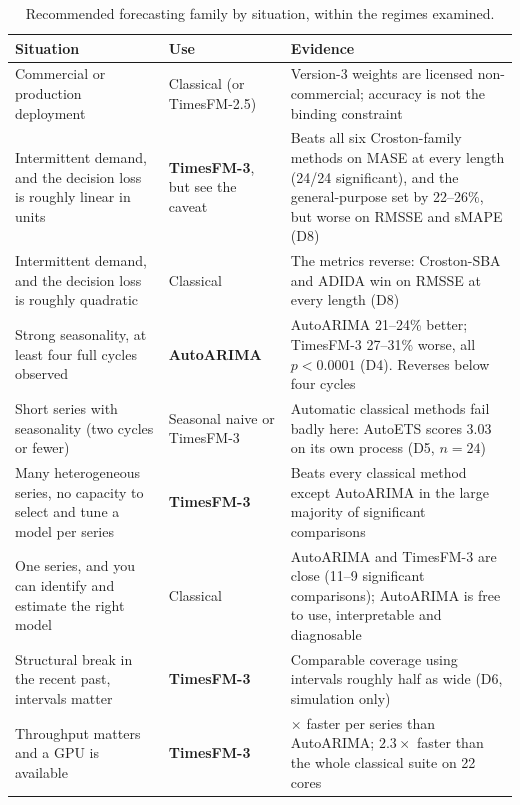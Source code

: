 \documentclass[11pt]{article}
\begin{document}
\begin{table}[!htbp]
\centering
\begin{threeparttable}
\caption{Recommended forecasting family by situation, within the regimes examined.}
\label{tab:decision}
\small
\begin{tabular}{>{\raggedright\arraybackslash}p{5.5cm}>{\raggedright\arraybackslash}p{3.0cm}>{\raggedright\arraybackslash}p{5.0cm}}
\toprule
Situation & Use & Evidence \\
\midrule
Commercial or production deployment
  & Classical (or TimesFM-2.5)
  & Version-3 weights are licensed non-commercial; accuracy is not the binding constraint \\[2pt]
Intermittent demand, and the decision loss is roughly linear in units
  & \textbf{TimesFM-3}, but see the caveat
  & Beats all six Croston-family methods on MASE at every length (24/24 significant), and the
    general-purpose set by 22--26\%, but worse on RMSSE and sMAPE (D8) \\[2pt]
Intermittent demand, and the decision loss is roughly quadratic
  & Classical
  & The metrics reverse: Croston-SBA and ADIDA win on RMSSE at every length (D8) \\[2pt]
Strong seasonality, at least four full cycles observed
  & \textbf{AutoARIMA}
  & AutoARIMA 21--24\% better; TimesFM-3 27--31\% worse, all $p < 0.0001$ (D4).
    Reverses below four cycles \\[2pt]
Short series with seasonality (two cycles or fewer)
  & Seasonal naive or TimesFM-3
  & Automatic classical methods fail badly here: AutoETS scores 3.03 on its own process (D5, $n=24$) \\[2pt]
Many heterogeneous series, no capacity to select and tune a model per series
  & \textbf{TimesFM-3}
  & Beats every classical method except AutoARIMA in the large majority of significant comparisons \\[2pt]
One series, and you can identify and estimate the right model
  & Classical
  & AutoARIMA and TimesFM-3 are close (11--9 significant comparisons); AutoARIMA is free to use, interpretable and diagnosable \\[2pt]
Structural break in the recent past, intervals matter
  & \textbf{TimesFM-3}
  & Comparable coverage using intervals roughly half as wide (D6, simulation only) \\[2pt]
Throughput matters and a GPU is available
  & \textbf{TimesFM-3}
  & 103$\times$ faster per series than AutoARIMA; $2.3\times$ faster than the whole
    classical suite on 22 cores \\[2pt]

\end{tabular}
\end{threeparttable}
\end{table}
\end{document}
